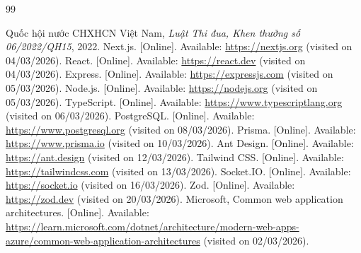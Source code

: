 \documentclass[a4paper,13pt,twoside]{report}
\theoremstyle{definition}
\begin{document}
\newpage
\renewcommand\bibname{TÀI LIỆU THAM KHẢO}
\begin{thebibliography}{99}
 Quốc hội nước CHXHCN Việt Nam, \textit{Luật Thi đua, Khen thưởng số 06/2022/QH15}, 2022.
 Next.js. [Online]. Available: \url{https://nextjs.org} (visited on 04/03/2026).
 React. [Online]. Available: \url{https://react.dev} (visited on 04/03/2026).
 Express. [Online]. Available: \url{https://expressjs.com} (visited on 05/03/2026).
 Node.js. [Online]. Available: \url{https://nodejs.org} (visited on 05/03/2026).
 TypeScript. [Online]. Available: \url{https://www.typescriptlang.org} (visited on 06/03/2026).
 PostgreSQL. [Online]. Available: \url{https://www.postgresql.org} (visited on 08/03/2026).
 Prisma. [Online]. Available: \url{https://www.prisma.io} (visited on 10/03/2026).
 Ant Design. [Online]. Available: \url{https://ant.design} (visited on 12/03/2026).
 Tailwind CSS. [Online]. Available: \url{https://tailwindcss.com} (visited on 13/03/2026).
 Socket.IO. [Online]. Available: \url{https://socket.io} (visited on 16/03/2026).
 Zod. [Online]. Available: \url{https://zod.dev} (visited on 20/03/2026).
 Microsoft, Common web application architectures. [Online]. Available: \url{https://learn.microsoft.com/dotnet/architecture/modern-web-apps-azure/common-web-application-architectures} (visited on 02/03/2026).
\end{thebibliography}
\end{document}

